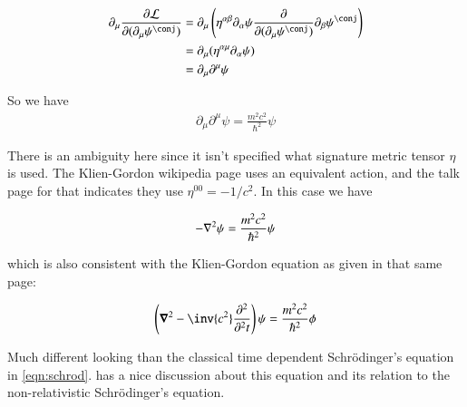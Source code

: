 \documentclass{article}
\begin{document}
\begin{align*}
\partial_\mu \PD{(\partial_\mu \psi^\conj)}{\LL}
&= \partial_\mu \left(\eta^{\alpha\beta}\partial_\alpha \psi \PD{(\partial_\mu \psi^\conj)}{} \partial_\beta \psi^\conj\right) \\
&= \partial_\mu (\eta^{\alpha\mu}\partial_\alpha \psi) \\
&= \partial_\mu \partial^\mu \psi \\
\end{align*}

So we have
\begin{align*}
\partial_\mu \partial^\mu \psi = \frac{m^2 c^2}{\hbar^2} \psi
\end{align*}

There is an ambiguity here 
since it isn't specified what signature metric tensor $\eta$ is used.  The Klien-Gordon wikipedia page uses an equivalent action, and the talk
page for that indicates they use $\eta^{00} = -1/c^2$.  In this case we have

\begin{align*}
-\nabla^2 \psi = \frac{m^2 c^2}{\hbar^2} \psi
\end{align*}

which is also consistent with the Klien-Gordon equation as given in that same page:

\begin{align*}
\left(\spacegrad^2 - \inv{c^2}\PDsq{t}{}\right) \psi = \frac{m^2 c^2}{\hbar^2} \phi
\end{align*}

Much different looking than the classical time dependent Schr\"{o}dinger's equation in \ref{eqn:schrod}.
\cite{srednicki2007qft} has a nice discussion about this equation and its relation to the non-relativistic Schr\"{o}dinger's equation.

\end{document}

